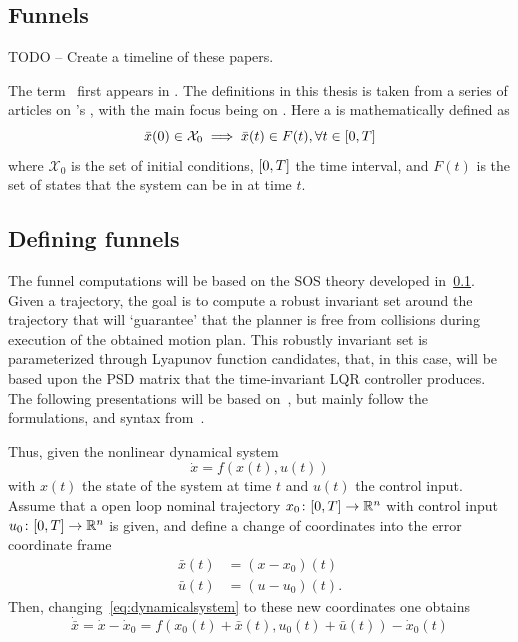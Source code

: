 \subsection{Funnels}
\label{sec:Funnels}

TODO -- Create a timeline of these papers.

The term \funnel\ first appears in \cite{masonMechanicsManipulation1985}. The
\funnel{} definitions in this thesis is taken from a series of articles on
\funnel{}'s \cite{tobenkinInvariantFunnelsTrajectories2010}
\cite{tedrakeLQRtreesFeedbackMotion2009, majumdarRobustOnlineMotion2013,
  majumdarFunnelLibrariesRealtime2017, ahmadiDSOSSDSOSOptimization2017}, with
the main focus being on \cite{majumdarFunnelLibrariesRealtime2017}. Here a
\funnel{} is mathematically defined as
\[
  \bar{x}(0) \in \mathcal{X}_0 \implies \bar{x}(t) \in F(t), \forall t \in
  \lbrack0,T\rbrack
\]
where \(\mathcal{X}_0\) is the set of initial conditions, \(\lbrack0,T\rbrack\) the time
interval, and \(F(t)\) is the set of states that the system can be in at time
\(t\).

\subsection{Defining funnels}

The funnel computations will be based on the \ac{SOS} theory developed
in~\cref{sec:Funnels}. Given a trajectory, the goal is to compute a robust
invariant set around the trajectory that will `guarantee' that the planner is
free from collisions during execution of the obtained motion plan. This robustly
invariant set is parameterized through Lyapunov function candidates, that, in
this case, will be based upon the \ac{PSD} matrix that the time-invariant
\ac{LQR} controller produces. The following presentations will be based
on~\cite{tobenkinInvariantFunnelsTrajectories2010,
  tedrakeLQRtreesFeedbackMotion2009, majumdarRobustOnlineMotion2013}, but mainly
follow the formulations, and syntax
from~\cite{majumdarFunnelLibrariesRealtime2017}.

Thus, given the nonlinear dynamical system
\begin{equation}
  \label{eq:dynamicalsystem}
  \dot{x} = f(x(t), u(t))
\end{equation}
with \(x(t)\) the state of the system at time \(t\) and \(u(t)\) the control
input. Assume that a open loop nominal trajectory \(x_0 \colon [0,T] \rightarrow
\mathbb{R}^n\) with control input \(u_0 \colon [0,T] \rightarrow \mathbb{R}^n\) is given, and
define a change of coordinates into the error coordinate frame
\begin{align}
  \bar{x}(t) &= (x - x_0)(t) \\
  \bar{u}(t) &= (u - u_0)(t).
\end{align}
Then, changing~\cref{eq:dynamicalsystem} to these new coordinates one obtains
\begin{equation}
  \label{eq:dynamicalsystem-coordinatechange}
  \dot{\bar{x}} = \dot{x} - \dot{x}_0 = f(x_0(t) + \bar{x}(t), u_0(t) + \bar{u}(t)) - \dot{x}_0(t)
\end{equation}

